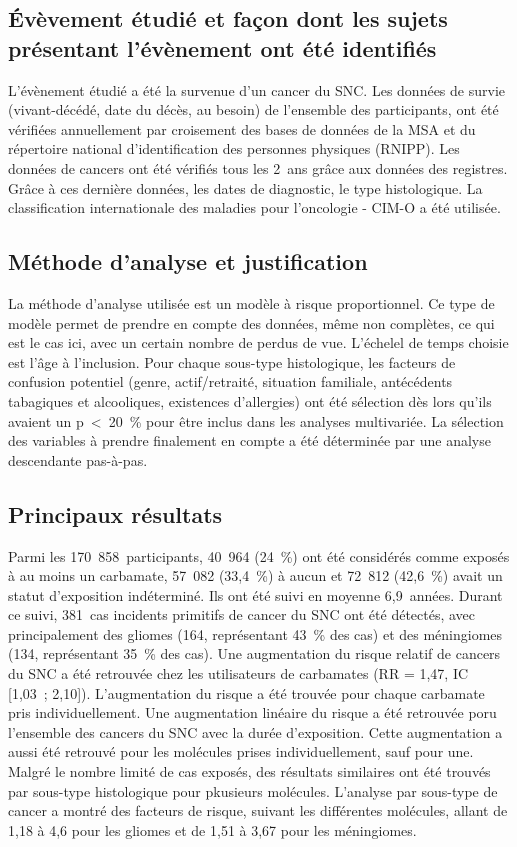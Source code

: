 \documentclass[10pt]{article}
\begin{document}
\subsection{\'{E}vèvement étudié et façon dont les sujets présentant l'évènement ont été identifiés}
L'évènement étudié a été la survenue d'un cancer du SNC. Les données de survie (vivant-décédé, date du décès, au besoin) de l'ensemble des participants, ont été vérifiées annuellement par croisement des bases de données de la MSA et du répertoire national d'identification des personnes physiques (RNIPP). Les données de cancers ont été vérifiés tous les 2~ans grâce aux données des registres. Grâce à ces dernière données, les dates de diagnostic, le type histologique. La classification internationale des maladies pour l'oncologie - CIM-O a été utilisée.

\subsection{Méthode d'analyse et justification}
La méthode d'analyse utilisée est un modèle à risque proportionnel. Ce type de modèle permet de prendre en compte des données, même non complètes, ce qui est le cas ici, avec un certain nombre de perdus de vue. L'échelel de temps choisie est l'âge à l'inclusion. Pour chaque sous-type histologique, les facteurs de confusion potentiel (genre, actif/retraité, situation familiale, antécédents tabagiques et alcooliques, existences d'allergies) ont été sélection dès lors qu'ils avaient un p~<~20~\% pour être inclus dans les analyses multivariée. La sélection des variables à prendre finalement en compte a été déterminée par une analyse descendante pas-à-pas.

\subsection{Principaux résultats}
Parmi les 170~858~participants, 40~964 (24~\%) ont été considérés comme exposés à au moins un carbamate, 57~082 (33,4~\%) à aucun et 72~812 (42,6~\%) avait un statut d'exposition indéterminé. Ils ont été suivi en moyenne 6,9~années. Durant ce suivi, 381~cas incidents primitifs de cancer du SNC ont été détectés, avec principalement des gliomes (164, représentant 43~\% des cas) et des méningiomes (134, représentant 35~\% des cas). Une augmentation du risque relatif de cancers du SNC a été retrouvée chez les utilisateurs de carbamates (RR = 1,47, IC [1,03~; 2,10]). L'augmentation du risque a été trouvée pour chaque carbamate pris individuellement. Une augmentation linéaire du risque a été retrouvée poru l'ensemble des cancers du SNC avec la durée d'exposition. Cette augmentation a aussi été retrouvé pour les molécules prises individuellement, sauf pour une. Malgré le nombre limité de cas exposés, des résultats similaires ont été trouvés par sous-type histologique pour pkusieurs molécules. L'analyse par sous-type de cancer a montré des facteurs de risque, suivant les différentes molécules, allant de 1,18 à 4,6 pour les gliomes et de 1,51 à 3,67 pour les méningiomes.
\end{document}

